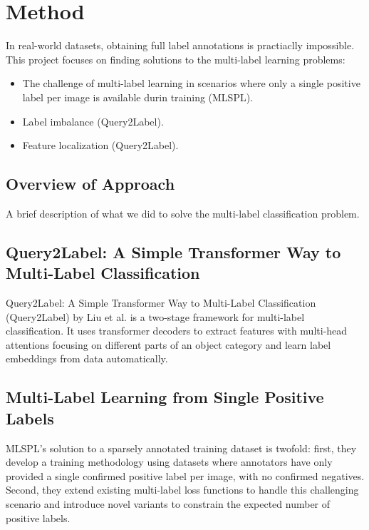 \documentclass[lettersize,journal]{IEEEtran}
\begin{document}

\section{Method}

In real-world datasets, obtaining full label annotations is practiaclly impossible.
This project focuses on finding solutions to the multi-label learning problems:
\begin{itemize} 
    \item  The challenge of multi-label learning in scenarios where only a single positive label per image is available durin training (MLSPL).
    \item Label imbalance (Query2Label).
    \item Feature localization (Query2Label).
\end{itemize}

\subsection{Overview of Approach}
A brief description of what we did to solve the multi-label classification problem. 



\subsection{Query2Label: A Simple Transformer Way to Multi-Label Classification}
\label{sec:q2l_method}
Query2Label: A Simple Transformer Way to Multi-Label Classification (Query2Label) by Liu et al. \cite{Query2Label} is a two-stage framework for multi-label classification. It uses transformer decoders to extract features with multi-head attentions focusing on different parts of an object category and learn label embeddings from data automatically.

\subsection{Multi-Label Learning from Single Positive Labels}
MLSPL's solution to a sparsely annotated training dataset is twofold: first, they develop a training methodology using datasets where annotators have only provided a single confirmed positive label per image, with no confirmed negatives. Second, they extend existing multi-label loss functions to handle this challenging scenario and introduce novel variants to constrain the expected number of positive labels.
\end{document}
